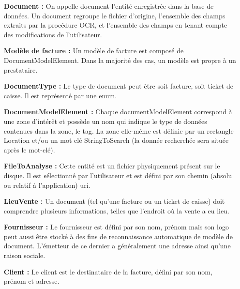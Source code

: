 \begin{itemize}
 \item[{\bf Document :}] On appelle document l'entité enregistrée dans la base de données. Un document regroupe le fichier d'origine, l'ensemble des champs extraits par la procédure OCR, et l'ensemble des champs en tenant compte des modifications de l'utilisateur.\\
 
 \item[{\bf Modèle de facture :}] Un modèle de facture est composé de DocumentModelElement.  Dans la majorité des cas, un modèle est propre à un prestataire.\\
 
 \item[{\bf DocumentType :}] Le type de document peut être soit facture, soit ticket de caisse. Il est représenté par une enum.\\
 
 \item[{\bf DocumentModelElement :}] Chaque documentModelElement correspond à une zone d'intérêt et possède un nom qui indique le type de données contenues dans la zone, le tag. La zone elle-même est définie par un rectangle Location et/ou un mot clé StringToSearch (la donnée recherchée sera située après le mot-clé).\\
 
 \item[{\bf FileToAnalyse :}] Cette entité est un fichier physiquement présent sur le disque. Il est sélectionné par l'utilisateur et est défini par son chemin (absolu ou relatif à l'application) uri.\\
 
 \item[{\bf LieuVente :}] Un document (tel qu'une facture ou un ticket de caisse) doit comprendre plusieurs informations, telles que l'endroit où la vente a eu lieu.\\
  
 \item[{\bf Fournisseur :}] Le fournisseur est défini par son nom, prénom mais son logo peut aussi être stocké à des fins de reconnaissance automatique de modèle de document. L'émetteur de ce dernier a généralement une adresse ainsi qu'une raison sociale.\\
  
 \item[{\bf Client :}] Le client est le destinataire de la facture, défini par son nom, prénom et adresse.\\
  

\end{itemize}
